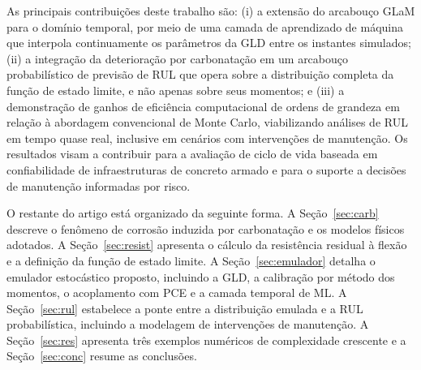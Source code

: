 As principais contribuições deste trabalho são: (i) a extensão do arcabouço GLaM para o domínio temporal, por meio de uma camada de aprendizado de máquina que interpola continuamente os parâmetros da GLD entre os instantes simulados; (ii) a integração da deterioração por carbonatação em um arcabouço probabilístico de previsão de RUL que opera sobre a distribuição completa da função de estado limite, e não apenas sobre seus momentos; e (iii) a demonstração de ganhos de eficiência computacional de ordens de grandeza em relação à abordagem convencional de Monte Carlo, viabilizando análises de RUL em tempo quase real, inclusive em cenários com intervenções de manutenção. Os resultados visam a contribuir para a avaliação de ciclo de vida baseada em confiabilidade de infraestruturas de concreto armado e para o suporte a decisões de manutenção informadas por risco.

O restante do artigo está organizado da seguinte forma. A Seção~\ref{sec:carb} descreve o fenômeno de corrosão induzida por carbonatação e os modelos físicos adotados. A Seção~\ref{sec:resist} apresenta o cálculo da resistência residual à flexão e a definição da função de estado limite. A Seção~\ref{sec:emulador} detalha o emulador estocástico proposto, incluindo a GLD, a calibração por método dos momentos, o acoplamento com PCE e a camada temporal de ML. A Seção~\ref{sec:rul} estabelece a ponte entre a distribuição emulada e a RUL probabilística, incluindo a modelagem de intervenções de manutenção. A Seção~\ref{sec:res} apresenta três exemplos numéricos de complexidade crescente e a Seção~\ref{sec:conc} resume as conclusões.
